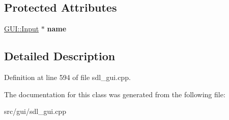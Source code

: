 \subsection*{Protected Attributes}
\begin{DoxyCompactItemize}
\item 
\hypertarget{classSaveLangDialog_aac396e13fdd8c3784b2c85e1d23adcd3}{\hyperlink{classGUI_1_1Input}{G\-U\-I\-::\-Input} $\ast$ {\bfseries name}}\label{classSaveLangDialog_aac396e13fdd8c3784b2c85e1d23adcd3}

\end{DoxyCompactItemize}


\subsection{Detailed Description}


Definition at line 594 of file sdl\-\_\-gui.\-cpp.



The documentation for this class was generated from the following file\-:\begin{DoxyCompactItemize}
\item 
src/gui/sdl\-\_\-gui.\-cpp\end{DoxyCompactItemize}
